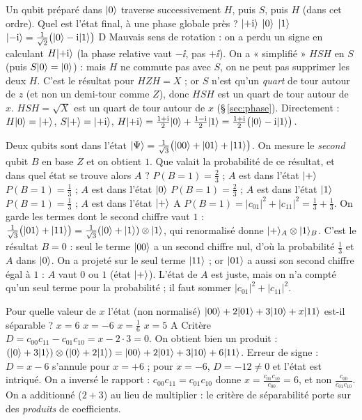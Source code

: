   {Un qubit préparé dans $|0\rangle$ traverse successivement $H$, puis $S$, puis $H$ (dans cet ordre). Quel est l'état final, à une phase globale près ?}
  {$|{+}\mathrm{i}\rangle$}
  {$|0\rangle$}
  {$|1\rangle$}
  {$|{-}\mathrm{i}\rangle=\frac{1}{\sqrt2}\big(|0\rangle-\mathrm{i}|1\rangle\big)$}
  {D}
\qcmx
  {Mauvais sens de rotation : on a perdu un signe en calculant $H|{+}\mathrm{i}\rangle$ (la phase relative vaut $-\ii$, pas $+\ii$).}
  {On a « simplifié » $HSH$ en $S$ (puis $S|0\rangle=|0\rangle$) : mais $H$ ne commute pas avec $S$, on ne peut pas supprimer les deux $H$.}
  {C'est le résultat pour $HZH=X$ ; or $S$ n'est qu'un \emph{quart} de tour autour de $z$ (et non un demi-tour comme $Z$), donc $HSH$ est un quart de tour autour de $x$.}
  {$HSH=\sqrt X$ est un quart de tour autour de $x$ (§\,\ref{sec:phase}). Directement : $H|0\rangle=|+\rangle$, $S|+\rangle=|{+}\mathrm{i}\rangle$, $H|{+}\mathrm{i}\rangle=\frac{1+\mathrm{i}}{2}|0\rangle+\frac{1-\mathrm{i}}{2}|1\rangle=\frac{1+\mathrm{i}}{2}\big(|0\rangle-\mathrm{i}|1\rangle\big)$.}

  {Deux qubits sont dans l'état $|\Psi\rangle=\frac{1}{\sqrt3}\big(|00\rangle+|01\rangle+|11\rangle\big)$. On mesure le \emph{second} qubit $B$ en base $Z$ et on obtient $1$. Que valait la probabilité de ce résultat, et dans quel état se trouve alors $A$ ?}
  {$P(B{=}1)=\frac23$ ; $A$ est dans l'état $|+\rangle$}
  {$P(B{=}1)=\frac13$ ; $A$ est dans l'état $|0\rangle$}
  {$P(B{=}1)=\frac23$ ; $A$ est dans l'état $|1\rangle$}
  {$P(B{=}1)=\frac13$ ; $A$ est dans l'état $|+\rangle$}
  {A}
\qcmx
  {$P(B{=}1)=|c_{01}|^2+|c_{11}|^2=\frac13+\frac13$. On garde les termes dont le second chiffre vaut $1$ : $\frac{1}{\sqrt3}\big(|01\rangle+|11\rangle\big)=\frac{1}{\sqrt3}(|0\rangle+|1\rangle)\otimes|1\rangle$, qui renormalisé donne $|+\rangle_A\otimes|1\rangle_B$.}
  {C'est le résultat $B=0$ : seul le terme $|00\rangle$ a un second chiffre nul, d'où la probabilité $\frac13$ et $A$ dans $|0\rangle$.}
  {On a projeté sur le seul terme $|11\rangle$ ; or $|01\rangle$ a aussi son second chiffre égal à $1$ : $A$ vaut $0$ ou $1$ (état $|+\rangle$).}
  {L'état de $A$ est juste, mais on n'a compté qu'un seul terme pour la probabilité ; il faut sommer $|c_{01}|^2+|c_{11}|^2$.}

  {Pour quelle valeur de $x$ l'état (non normalisé) $|00\rangle+2|01\rangle+3|10\rangle+x|11\rangle$ est-il séparable ?}
  {$x=6$}
  {$x=-6$}
  {$x=\frac16$}
  {$x=5$}
  {A}
\qcmx
  {Critère $D=c_{00}c_{11}-c_{01}c_{10}=x-2\cdot3=0$. On obtient bien un produit : $(|0\rangle+3|1\rangle)\otimes(|0\rangle+2|1\rangle)=|00\rangle+2|01\rangle+3|10\rangle+6|11\rangle$.}
  {Erreur de signe : $D=x-6$ s'annule pour $x=+6$ ; pour $x=-6$, $D=-12\neq0$ et l'état est intriqué.}
  {On a inversé le rapport : $c_{00}c_{11}=c_{01}c_{10}$ donne $x=\frac{c_{01}c_{10}}{c_{00}}=6$, et non $\frac{c_{00}}{c_{01}c_{10}}$.}
  {On a additionné ($2+3$) au lieu de multiplier : le critère de séparabilité porte sur des \emph{produits} de coefficients.}

